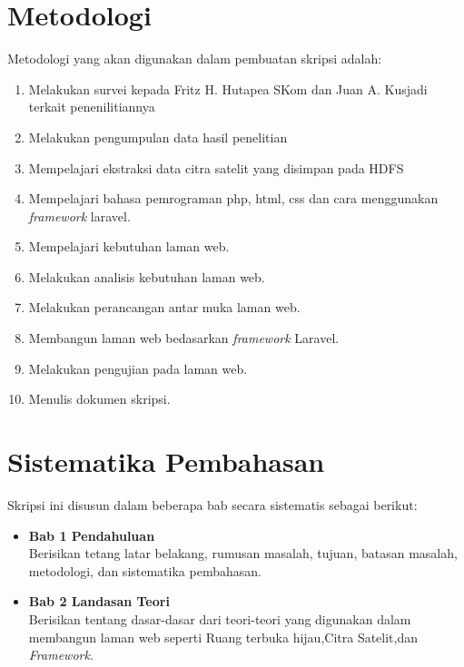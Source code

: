 \section{Metodologi}
\label{sec:metlit}
Metodologi yang akan digunakan dalam pembuatan skripsi adalah:
\begin{enumerate}
	\item Melakukan survei kepada Fritz H. Hutapea SKom dan Juan A. Kusjadi terkait penenilitiannya
	\item Melakukan pengumpulan data hasil penelitian
	\item Mempelajari ekstraksi data citra satelit yang disimpan pada HDFS
	\item Mempelajari bahasa pemrograman php, html, css dan cara menggunakan \emph{framework} laravel.
	\item Mempelajari kebutuhan laman web.
	\item Melakukan analisis kebutuhan laman web.
	\item Melakukan perancangan antar muka laman web.
	\item Membangun laman web bedasarkan \emph{framework} Laravel.
	\item Melakukan pengujian pada laman web.
	\item Menulis dokumen skripsi.
\end{enumerate}

\section{Sistematika Pembahasan}
\label{sec:sispem}

Skripsi ini disusun dalam beberapa bab secara sistematis sebagai berikut:
\begin{itemize}
	\item \textbf{Bab 1 Pendahuluan} \\ 
	Berisikan tetang latar belakang, rumusan masalah, tujuan, batasan masalah, metodologi, dan sistematika pembahasan.
	\item \textbf{Bab 2 Landasan Teori} \\ 
	Berisikan tentang dasar-dasar dari teori-teori yang digunakan dalam membangun laman web seperti Ruang terbuka hijau,Citra Satelit,dan \textit{Framework}.
	
\end{itemize}
